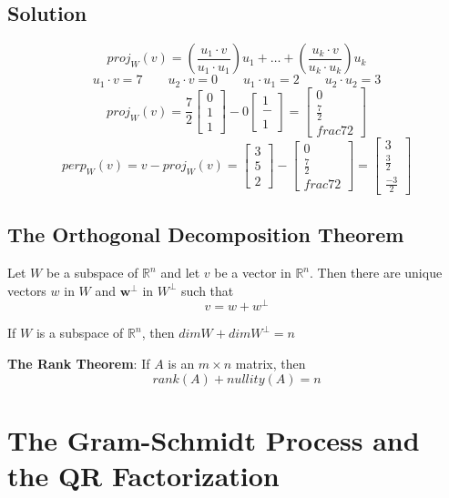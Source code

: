 \subsection*{Solution}
$$proj_W(v) = (\frac{u_1\cdot v}{u_1\cdot u_1})u_1 + \dots + (\frac{u_k\cdot v}{u_k\cdot u_k})u_k$$
$$u_1\cdot v = 7\qquad u_2\cdot v = 0\qquad u_1\cdot u_1 = 2\qquad u_2\cdot u_2 = 3$$
$$proj_W(v) = \frac{7}{2}\begin{bmatrix}
    0\\1\\1
\end{bmatrix} - 0\begin{bmatrix}
    1\\-\\1
\end{bmatrix} = \begin{bmatrix}
    0\\\frac{7}{2}\\frac{7}{2}
\end{bmatrix}$$
$$perp_W(v) = v - proj_W(v) = \begin{bmatrix}
    3\\5\\2
\end{bmatrix} - \begin{bmatrix}
    0\\\frac{7}{2}\\frac{7}{2}
\end{bmatrix} = \begin{bmatrix}
    3\\\frac{3}{2}\\\frac{-3}{2}
\end{bmatrix}$$
\subsection*{The Orthogonal Decomposition Theorem}
Let $W$ be a subspace of $\mathbb{R}^n$ and let $v$ be a vector in $\mathbb{R}^n$. Then there are unique vectors $w$ in $W$ and $\textbf{w}^\perp$ in $W^\perp$ such that
$$v = w + w^\perp$$

If $W$ is a subspace of $\mathbb{R}^n$, then $dim W + dim W^\perp = n$

\textbf{The Rank Theorem}: If $A$ is an $m\times n$ matrix, then
$$rank(A) + nullity(A) = n$$

\section{The Gram-Schmidt Process and the QR Factorization}

